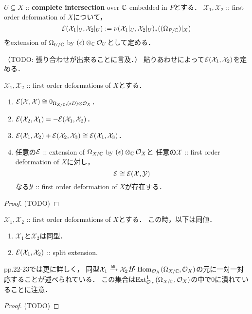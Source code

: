 \documentclass[a4paper]{jsarticle}
\newcommand{\famX}{\mathcal{X}}
\newcommand{\famY}{\mathcal{Y}}
\begin{document}
    \begin{Def}
        $U \subseteq X$ :: \textbf{complete intersection} over $\mathbb{C}$ embedded in $P$とする．
        $\famX_1, \famX_2$ :: first order deformation of $X$について，
        \[ \shE(\famX_1|_U, \famX_2|_U):=\nu(\famX_1|_U, \famX_2|_U)_*((\shDer_{P/\C})|_{X}) \]
        をextension of $\Omega_{U/\mathbb{C}}$ by $(\epsilon) \otimes_{\mathbb{C}} \mathcal{O}_{U}$として定める．
    \end{Def}
    （TODO: 張り合わせが出来ることに言及．）
    貼りあわせによって$\shE(\famX_1, \famX_2)$を定める．

    \begin{Prop}\label{prop:key1}
        $\famX_1, \famX_2$ :: first order deformations of $X$とする．
        \begin{enumerate}[label=(\alph*), leftmargin=*]
        \item
            $\shE(\famX, \famX) \iso 0_{\shDer_{X/ \C}, (\epsilon D) \otimes \shO_X}$．
        \item
            $\shE(\famX_2, \famX_1)=-\shE(\famX_1, \famX_2)$．
        \item 
            $\shE(\famX_1, \famX_2)+\shE(\famX_2, \famX_3) \iso \shE(\famX_1, \famX_3)$．

        \item
            任意の$\mathcal{E}$ :: extension of $\Omega_{X/\mathbb{C}}$ by $(\epsilon) \otimes_{\mathbb{C}} \mathcal{O}_{X}$と
            任意の$\famX$ :: first order deformation of $X$に対し，
            \[ \shE \iso \shE(\famX, \famY) \]
            なる$\famY$ :: first order deformation of $X$が存在する．
        \end{enumerate}
    \end{Prop}
    \begin{proof}
        (TODO)
    \end{proof}

    \begin{Prop}\label{prop:key2}
        $\famX_1, \famX_2$ :: first order deformations of $X$とする．
        この時，以下は同値．
        \begin{enumerate}
            \item $\famX_1$と$\famX_2$は同型．
            \item $\shE(\famX_1, \famX_2)$ :: split extension.
        \end{enumerate}
    \end{Prop}
    \cite{DefLCI} pp.22-23では更に詳しく，
    同型$\famX_1 \isomap \famX_2$が
    $\operatorname{Hom}_{\mathcal{O}_X}(\Omega_{X/\mathbb{C}}, \mathcal{O}_X)$の元に一対一対応することが述べられている．
    この集合は$\operatorname{Ext}^1_{\mathcal{O}_X}(\Omega_{X/\mathbb{C}}, \mathcal{O}_X)$の中で$0$に潰れていることに注意．
    \begin{proof}
        (TODO)
    \end{proof}
\end{document}
